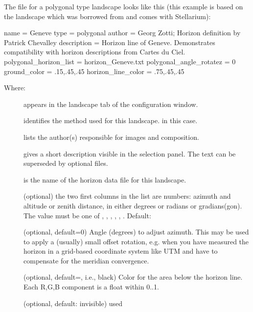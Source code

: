 \noindent The  file for a polygonal type landscape looks
like this (this example is based on the  landscape
which was borrowed from  and comes with Stellarium):

\begin{configfile}
[landscape]
name = Geneve
type = polygonal
author = Georg Zotti; Horizon definition by Patrick Chevalley
description = Horizon line of Geneve.
              Demonstrates compatibility with
              horizon descriptions from Cartes du Ciel.
polygonal_horizon_list = horizon_Geneve.txt
polygonal_angle_rotatez = 0
ground_color = .15,.45,.45
horizon_line_color = .75,.45,.45
\end{configfile}
%
Where:
\begin{description}
\item[] appears in the landscape tab of the configuration window.
\item[] identifies the method used for this landscape.  in this case.
\item[] lists the author(s) responsible for images and composition.
\item[] gives a short description visible in the
  selection panel. The text can be superseded by optional
   files.
\item[] is the name of the horizon data file for this landscape.
\item[] (optional) the two first
  columns in the list are numbers: azimuth and altitude or zenith
  distance, in either degrees or radians or gradians(gon). The value
  must be one of , , ,
    , , . Default:
\item[] (optional, default=0) Angle
  (degrees) to adjust azimuth. This may be used to apply a (usually)
  small offset rotation, e.g. when you have measured the horizon in a
  grid-based coordinate system like UTM and have to compensate for the
  meridian convergence.
\item[] (optional, default=, i.e.,
  black) Color for the area below the horizon line. Each R,G,B
  component is a float within 0..1.
\item[] (optional, default: invisible) used

\end{description}
